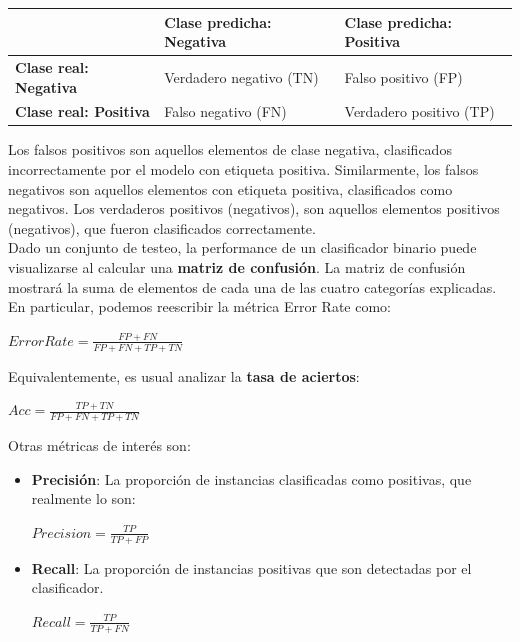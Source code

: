 \begin{table}[h!]
\begin{tabular}{l|l|l|}
\cline{2-3}
                                                    & \textbf{Clase predicha: Negativa} & \textbf{Clase predicha: Positiva} \\ \hline
\multicolumn{1}{|l|}{\textbf{Clase real: Negativa}} & Verdadero negativo (TN)           & Falso positivo (FP)               \\ \hline
\multicolumn{1}{|l|}{\textbf{Clase real: Positiva}} & Falso negativo (FN)               & Verdadero positivo (TP)           \\ \hline
\end{tabular}
\end{table}

Los falsos positivos son aquellos elementos de clase negativa, clasificados incorrectamente por el modelo con etiqueta positiva. Similarmente, los falsos negativos son aquellos elementos con etiqueta positiva, clasificados como negativos. Los verdaderos positivos (negativos), son aquellos elementos positivos (negativos), que fueron clasificados correctamente. \\

Dado un conjunto de testeo, la performance de un clasificador binario puede visualizarse al calcular una \textbf{matriz de confusión}. La matriz de confusión mostrará la suma de elementos de cada una de las cuatro categorías explicadas. En particular, podemos reescribir la métrica Error Rate como: \\

\begin{center}
$ Error Rate = \frac{FP + FN}{FP + FN + TP + TN} $
\end{center}

Equivalentemente, es usual analizar la \textbf{tasa de aciertos}:

\begin{center}
$ Acc = \frac{TP + TN}{FP + FN + TP + TN} $
\end{center}

Otras métricas de interés son:

\begin{itemize}
\item \textbf{Precisión}: La proporción de instancias clasificadas como positivas, que realmente lo son:
\begin{center}
$ Precision =  \frac{TP}{TP + FP}$
\end{center}

\item \textbf{Recall}: La proporción de instancias positivas que son detectadas por el clasificador.
\begin{center}
$ Recall =  \frac{TP}{TP + FN}$
\end{center}

\end{itemize}

